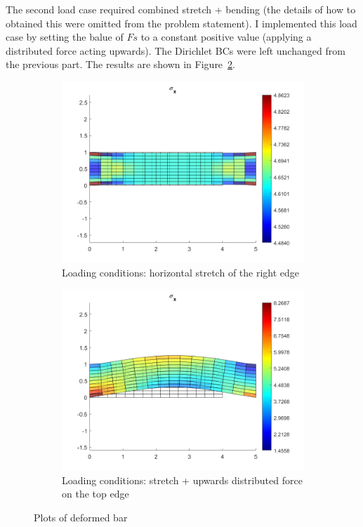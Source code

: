 \documentclass[hidelinks]{article}
\begin{document}
The second load case required combined stretch + bending (the details of how to obtained this were omitted from the problem statement). I implemented this load case by setting the balue of $Fs$ to a constant positive value (applying a distributed force acting upwards). The Dirichlet BCs were left unchanged from the previous part. The results are shown in Figure~\ref{fig:bending}.
%
\begin{figure}[h]
    \centering
    \begin{subfigure}[t]{0.49\textwidth}
        \centering
        \includegraphics[width=1\textwidth]{Report/stretch.png}
        \caption{Loading conditions: horizontal stretch of the right edge}
        \label{fig:stretch}
    \end{subfigure}
    \hfill
    \begin{subfigure}[t]{0.49\textwidth}
        \centering
        \includegraphics[width=1\textwidth]{Report/bending.png}
        \caption{Loading conditions: stretch + upwards distributed force on the top edge}
        \label{fig:bending}
    \end{subfigure}
    \caption{Plots of deformed bar}
    \label{fig:functionPlots}
\end{figure}
%
\end{document}
